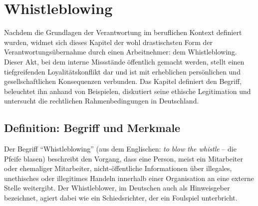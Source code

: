 \documentclass[
    12pt,               %
    a4paper,            %
    ngerman             %
]{scrartcl}
\begin{document}
\section{Whistleblowing}
\nocite{ihk-whistleblowing}
\par\noindent %


Nachdem die Grundlagen der Verantwortung im beruflichen Kontext definiert wurden, widmet sich dieses Kapitel der wohl drastischsten Form der Verantwortungsübernahme durch einen Arbeitnehmer: dem Whistleblowing. Dieser Akt, bei dem interne Missstände öffentlich gemacht werden, stellt einen tiefgreifenden Loyalitätskonflikt dar und ist mit erheblichen persönlichen und gesellschaftlichen Konsequenzen verbunden. Das Kapitel definiert den Begriff, beleuchtet ihn anhand von Beispielen, diskutiert seine ethische Legitimation und untersucht die rechtlichen Rahmenbedingungen in Deutschland.

\subsection{Definition: Begriff und Merkmale}
Der Begriff \enquote{Whistleblowing} (aus dem Englischen: \textit{to blow the whistle} – die Pfeife blasen) beschreibt den Vorgang, dass eine Person, meist ein Mitarbeiter oder ehemaliger Mitarbeiter, nicht-öffentliche Informationen über illegales, unethisches oder illegitimes Handeln innerhalb einer Organisation an eine externe Stelle weitergibt. Der Whistleblower, im Deutschen auch als Hinweisgeber bezeichnet, agiert dabei wie ein Schiedsrichter, der ein Foulspiel unterbricht.
\end{document}
